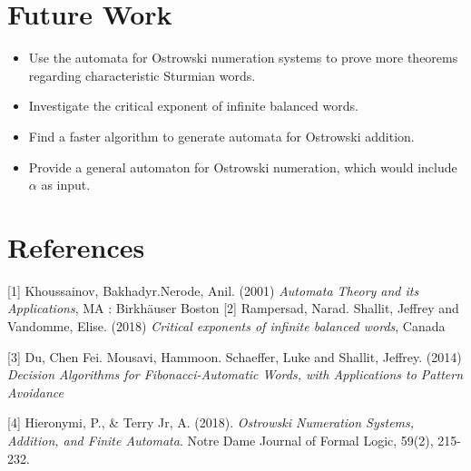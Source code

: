 \documentclass[landscape]{sciposter}
\begin{document}
\begin{multicols}{3}
\section*{Future Work}
\begin{itemize}
\item Use the automata for Ostrowski numeration systems to prove more theorems regarding characteristic Sturmian words.
\item Investigate the critical exponent of infinite balanced words.
\item Find a faster algorithm to generate automata for Ostrowski addition.
\item Provide a general automaton for Ostrowski numeration, which would include $\alpha$ as input.
\end{itemize}

\vspace*{-10pt}  %
\section*{References}

{\footnotesize [1] Khoussainov, Bakhadyr.Nerode, Anil. (2001) \emph{Automata Theory and its Applications}, MA : Birkh\"auser Boston
}
{\footnotesize [2] Rampersad, Narad. Shallit, Jeffrey and  Vandomme, Elise. (2018) \emph{Critical exponents of infinite balanced words}, Canada
}

{\footnotesize [3] Du, Chen Fei. Mousavi, Hammoon. Schaeffer, Luke and Shallit, Jeffrey. (2014) \emph{Decision Algorithms for Fibonacci-Automatic Words, with Applications to Pattern Avoidance}
}

{\footnotesize [4] Hieronymi, P., \& Terry Jr, A. (2018). \emph{Ostrowski Numeration Systems, Addition, and Finite Automata}. Notre Dame Journal of Formal Logic, 59(2), 215-232.
}

\vspace*{2cm} %
\centerline{\emph{
}}
\end{multicols}
\end{document}
